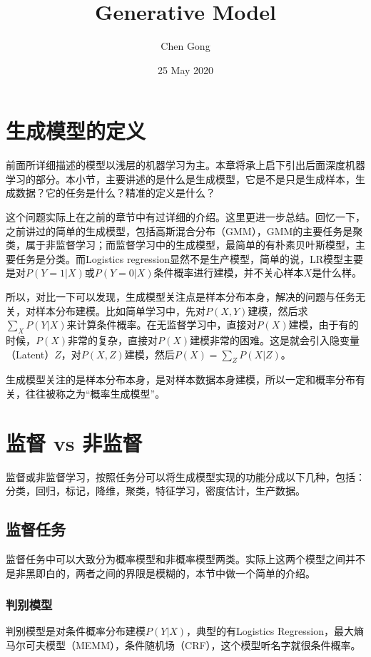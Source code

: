 \documentclass[a4paper]{article}
\title{Generative Model}
\author{Chen Gong}
\date{25 May 2020}
\begin{document}
\maketitle
\tableofcontents
\newpage
\setcounter{page}{1} %
\clearpage
\maketitle

\section{生成模型的定义}
前面所详细描述的模型以浅层的机器学习为主。本章将承上启下引出后面深度机器学习的部分。本小节，主要讲述的是什么是生成模型，它是不是只是生成样本，生成数据？它的任务是什么？精准的定义是什么？

这个问题实际上在之前的章节中有过详细的介绍。这里更进一步总结。回忆一下，之前讲过的简单的生成模型，包括高斯混合分布（GMM），GMM的主要任务是聚类，属于非监督学习；而监督学习中的生成模型，最简单的有朴素贝叶斯模型，主要任务是分类。而Logistics regression显然不是生产模型，简单的说，LR模型主要是对$P(Y=1|X)$或$P(Y=0|X)$条件概率进行建模，并不关心样本$X$是什么样。

所以，对比一下可以发现，生成模型关注点是样本分布本身，解决的问题与任务无关，对样本分布建模。比如简单学习中，先对$P(X,Y)$建模，然后求$\sum_X P(Y|X)$来计算条件概率。在无监督学习中，直接对$P(X)$建模，由于有的时候，$P(X)$非常的复杂，直接对$P(X)$建模非常的困难。这是就会引入隐变量（Latent）$Z$，对$P(X,Z)$建模，然后$P(X) = \sum_Z P(X|Z)$。

{\color{red}生成模型关注的是样本分布本身，是对样本数据本身建模，所以一定和概率分布有关，往往被称之为“概率生成模型”。}

\section{监督 vs 非监督}
监督或非监督学习，按照任务分可以将生成模型实现的功能分成以下几种，包括：{\color{red} 分类，回归，标记，降维，聚类，特征学习，密度估计，生产数据。}
\subsection{监督任务}
监督任务中可以大致分为概率模型和非概率模型两类。实际上这两个模型之间并不是非黑即白的，两者之间的界限是模糊的，本节中做一个简单的介绍。
\subsubsection{判别模型}
判别模型是对条件概率分布建模$P(Y|X)$，典型的有Logistics Regression，最大熵马尔可夫模型（MEMM），条件随机场（CRF），这个模型听名字就很条件概率。
\end{document}
